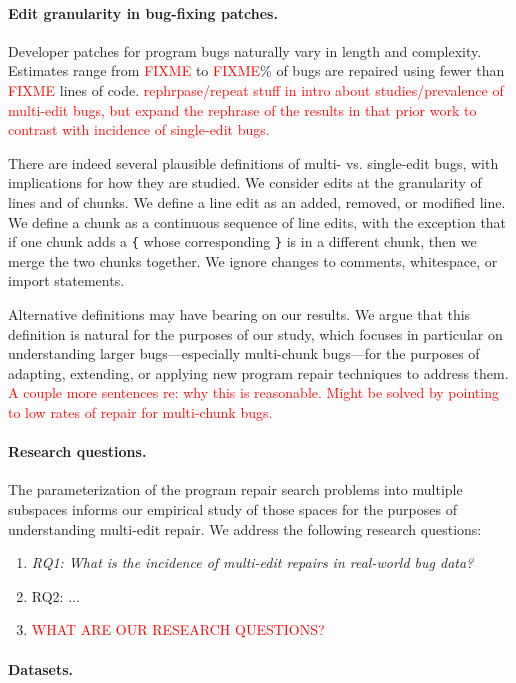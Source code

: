 \documentclass[sigconf, timestamp-false, anonymous=true]{acmart}
\newcommand\todo[1]{\textcolor{red}{#1}}
\begin{document}
\paragraph{Edit granularity in bug-fixing patches.}  Developer patches for
program bugs naturally vary in length and complexity.  Estimates range from
\todo{FIXME} to \todo{FIXME}\% of bugs are repaired using fewer than
\todo{FIXME} lines of code.  \todo{rephrpase/repeat stuff in intro about
  studies/prevalence of multi-edit bugs, but expand the rephrase of the results
  in that prior work to contrast with incidence of single-edit bugs.}  

There are indeed several plausible definitions of multi- vs. single-edit bugs,
with implications for how they are studied.  We consider edits at the granularity 
of lines and of chunks. We define a line edit as an added, removed, or modified 
line. We define a chunk as a continuous sequence of line edits, with the exception 
that if one chunk adds a \texttt{\{} whose corresponding \texttt{\}} is in a different chunk, 
then we merge the two chunks together. 
We ignore changes to comments, whitespace, or import statements.

Alternative definitions may have bearing on our results.  We argue that this
definition is natural for the purposes of our study, which focuses in particular
on understanding larger bugs---especially multi-chunk bugs---for the purposes of 
adapting, extending, or applying new program repair techniques to address them. 
\todo{A couple more sentences re: why this is reasonable. Might be solved by 
pointing to low rates of repair for multi-chunk bugs.}

\paragraph{Research questions.}  The parameterization of the program repair
search problems into multiple subspaces informs our empirical study of those
spaces for the purposes of understanding multi-edit repair.  We address the
following research questions:

\begin{enumerate}
\item \emph{RQ1: What is the incidence of multi-edit repairs in real-world bug data?}
\item RQ2: ...
\item \todo{WHAT ARE OUR RESEARCH QUESTIONS?}
\end{enumerate}

\paragraph{Datasets.}  
\end{document}
